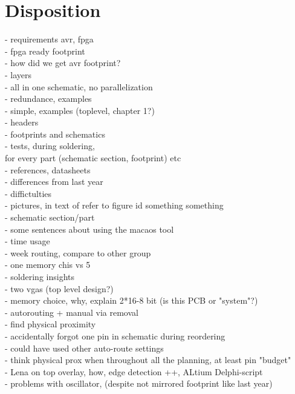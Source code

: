 \section {Disposition}
- requirements avr, fpga \\
- fpga ready footprint \\
- how did we get avr footprint? \\
- layers \\
- all in one schematic, no parallelization \\
- redundance, examples \\
- simple, examples (toplevel, chapter 1?) \\
- headers \\
- footprints and schematics \\
- tests, during soldering, \\

for every part (schematic section, footprint) etc \\
    - references, datasheets \\
    - differences from last year \\
    - diffictulties \\
    - pictures, in text of refer to figure id something something \\
    - schematic section/part \\

    - some sentences about using the macaos tool \\
    - time usage \\
    - week routing, compare to other group \\
    - one memory chis vs 5 \\
    - soldering insights \\
    - two vgas (top level design?) \\
    - memory choice, why, explain 2*16-8 bit (is this PCB or "system"?) \\
    - autorouting + manual via removal \\
    - find physical proximity \\
    - accidentally forgot one pin in schematic during reordering \\
    - could have used other auto-route settings \\
    - think physical prox when throughout all the planning, at least pin "budget" \\
    - Lena on top overlay, how, edge detection ++, ALtium Delphi-script \\
    - problems with oscillator, (despite not mirrored footprint like last year) \\

